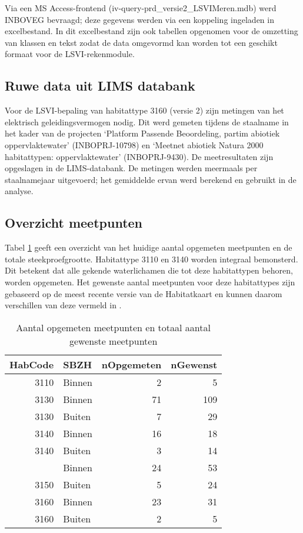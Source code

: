 \documentclass[twoside]{extreport}
\begin{document}
Via een MS Access-frontend (iv-query-prd\_versie2\_LSVIMeren.mdb) werd
INBOVEG bevraagd; deze gegevens werden via een koppeling ingeladen in
excelbestand. In dit excelbestand zijn ook tabellen opgenomen voor de
omzetting van klassen en tekst zodat de data omgevormd kan worden tot
een geschikt formaat voor de LSVI-rekenmodule.

\subsection{Ruwe data uit LIMS
databank}\label{ruwe-data-uit-lims-databank}

Voor de LSVI-bepaling van habitattype 3160 (versie 2) zijn metingen van
het elektrisch geleidingsvermogen nodig. Dit werd gemeten tijdens de
staalname in het kader van de projecten `Platform Passende Beoordeling,
partim abiotiek oppervlaktewater' (INBOPRJ-10798) en `Meetnet abiotiek
Natura 2000 habitattypen: oppervlaktewater' (INBOPRJ-9430). De
meetresultaten zijn opgeslagen in de LIMS-databank. De metingen werden
meermaals per staalnamejaar uitgevoerd; het gemiddelde ervan werd
berekend en gebruikt in de analyse.

\subsection{Overzicht meetpunten}\label{overzicht-meetpunten-5}

Tabel \ref{tab:tabAantallenPlassen} geeft een overzicht van het huidige
aantal opgemeten meetpunten en de totale steekproefgrootte. Habitattype
3110 en 3140 worden integraal bemonsterd. Dit betekent dat alle gekende
waterlichamen die tot deze habitattypen behoren, worden opgemeten. Het
gewenste aantal meetpunten voor deze habitattypes zijn gebaseerd op de
meest recente versie van de Habitatkaart \citep{DeSaeger2018} en kunnen
daarom verschillen van deze vermeld in \citep{Westra2014}.

\begin{table}[!h]

\caption{\label{tab:tabAantallenPlassen}Aantal opgemeten meetpunten en totaal aantal gewenste meetpunten}
\centering
\begin{tabular}{rlrr}
\toprule
HabCode & SBZH & nOpgemeten & nGewenst\\
\midrule
3110 & Binnen & 2 & 5\\
3130 & Binnen & 71 & 109\\
3130 & Buiten & 7 & 29\\
3140 & Binnen & 16 & 18\\
3140 & Buiten & 3 & 14\\
\addlinespace
3150 & Binnen & 24 & 53\\
3150 & Buiten & 5 & 24\\
3160 & Binnen & 23 & 31\\
3160 & Buiten & 2 & 5\\
\bottomrule
\end{tabular}
\end{table}
\end{document}
